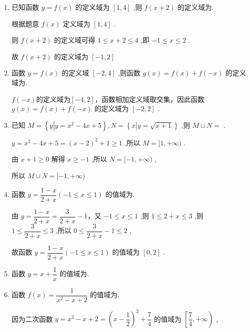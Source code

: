 \begin{enumerate}
\begin{jieda}
        所以满足题意的实数 $a$ 的取值范围为 $\left\lbrack  {\dfrac{10}{3}, + \infty }\right)$ .
    \end{jieda}
    \item 已知函数 $y = f\left( x\right)$ 的定义域为 $\left\lbrack  {1,4}\right\rbrack$ ,则 $f\left( {x + 2}\right)$ 的定义域为.
    \begin{jieda}
        根据题意 $f\left( x\right)$ 定义域为 $\left\lbrack  {1,4}\right\rbrack$ .
        
        则 $f\left( {x + 2}\right)$ 的定义域可得 $1 \leq  x + 2 \leq  4$ ,即 $- 1 \leq  x \leq  2$ .
        
        故 $f\left( {x + 2}\right)$ 的定义域为 $\left\lbrack  {-1,2}\right\rbrack$
    \end{jieda}
    \item 函数 $y = f\left( x\right)$ 的定义域 $\left\lbrack  {-2,4}\right\rbrack$ ,则函数 $g\left( x\right)  = f\left( x\right)  + f\left( {-x}\right)$ 的定义域为.
    \begin{jieda}
        $f(-x)$的定义域为$[-4, 2]$，函数相加定义域取交集，因此函数 $g\left( x\right)  = f\left( x\right)  + f\left( {-x}\right)$ 的定义域为 $\left\lbrack  {-2,2}\right\rbrack$ .
    \end{jieda}
    \item 已知 $M = \left\{  {y\left| {y = {x}^{2} - {4x} + 5}\right. }\right\}  ,N = \left\{  {x\left| {y = \sqrt{x + 1}}\right. }\right\}$ ,则 $M \cup  N =$ .
    \begin{jieda}
        $y = {x}^{2} - {4x} + 5 = {\left( x - 2\right) }^{2} + 1 \geq  1$ ,所以 $M = \lbrack 1, + \infty )$ .
        
        由 $x + 1 \geq  0$ 解得 $x \geq   - 1$ ,所以 $N = \lbrack  - 1, + \infty )$ ,
        
        所以 $M \cup  N = \lbrack  - 1, + \infty )$
    \end{jieda}
    \item 函数 $y = \dfrac{1 - x}{2 + x}\left( {-1 \leq  x \leq  1}\right)$ 的值域为.
    \begin{jieda}
        由 $y = \dfrac{1 - x}{2 + x} = \dfrac{3}{2 + x} - 1$，又 $- 1 \leq  x \leq  1$ ,则 $1 \leq  2 + x \leq  3$ ,则 $1 \leq  \dfrac{3}{2 + x} \leq  3$ ,所以 $0 \leq  \dfrac{3}{2 + x} - 1 \leq  2$ ,
        
        故函数 $y = \dfrac{1 - x}{2 + x}\left( {-1 \leq  x \leq  1}\right)$ 的值域为 $\left\lbrack  {0,2}\right\rbrack$ .
    \end{jieda}
    \item 函数 $y = x + \dfrac{1}{x}$ 的值域为.
    \item 函数 $f\left( x\right)  = \dfrac{1}{{x}^{2} - x + 2}$ 的值域为.
    \begin{jieda}
        因为二次函数 $y = {x}^{2} - x + 2 = {\left( x - \dfrac{1}{2}\right) }^{2} + \dfrac{7}{4}$ 的值域为 $\left\lbrack  {\dfrac{7}{4}, + \infty }\right)$ ,
        

\end{jieda}
\end{enumerate}
